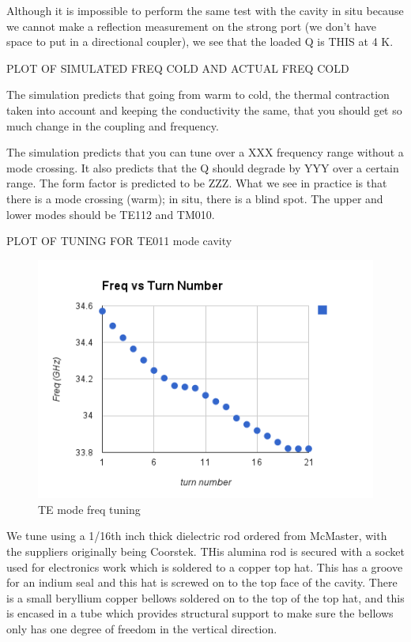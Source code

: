 \documentclass[11pt]{article}
\begin{document}
Although it is impossible to perform the same test with the cavity in situ because we cannot make a reflection measurement on the strong port (we don’t have space to put in a directional coupler), we see that the loaded Q is THIS at 4 K. 

PLOT OF SIMULATED FREQ COLD AND ACTUAL FREQ COLD

The simulation predicts that going from warm to cold, the thermal contraction taken into account and keeping the conductivity the same, that you should get so much change in the coupling and frequency.

The simulation predicts that you can tune over a XXX frequency range without a mode crossing. It also predicts that the Q should degrade by YYY over a certain range. The form factor is predicted to be ZZZ. What we see in practice is that there is a mode crossing (warm); in situ, there is a blind spot. The upper and lower modes should be TE112 and TM010.

PLOT OF TUNING FOR TE011 mode cavity
\begin{figure}
\includegraphics[scale=0.7]{freq_vs_turn_number}
\caption{TE mode freq tuning}
\end{figure}

We tune using a 1/16th inch thick dielectric rod ordered from McMaster, with the suppliers originally being Coorstek. THis alumina rod is secured with a socket used for electronics work which is soldered to a copper top hat. This has a groove for an indium seal and this hat is screwed on to the top face of the cavity. There is a small beryllium copper bellows soldered on to the top of the top hat, and this is encased in a tube which provides structural support to make sure the bellows only has one degree of freedom in the vertical direction. 
\end{document}
